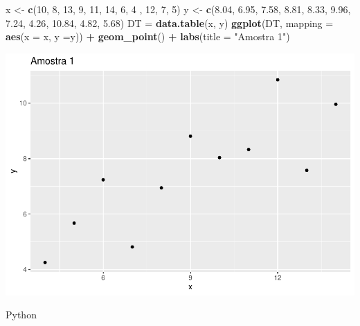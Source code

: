 \documentclass[
]{book}
\newenvironment{Shaded}{\begin{snugshade}}{\end{snugshade}}
\newcommand{\AttributeTok}[1]{\textcolor[rgb]{0.13,0.29,0.53}{#1}}
\newcommand{\DecValTok}[1]{\textcolor[rgb]{0.00,0.00,0.81}{#1}}
\newcommand{\FloatTok}[1]{\textcolor[rgb]{0.00,0.00,0.81}{#1}}
\newcommand{\FunctionTok}[1]{\textcolor[rgb]{0.13,0.29,0.53}{\textbf{#1}}}
\newcommand{\NormalTok}[1]{#1}
\newcommand{\OtherTok}[1]{\textcolor[rgb]{0.56,0.35,0.01}{#1}}
\newcommand{\SpecialCharTok}[1]{\textcolor[rgb]{0.81,0.36,0.00}{\textbf{#1}}}
\newcommand{\StringTok}[1]{\textcolor[rgb]{0.31,0.60,0.02}{#1}}
\begin{document}
\begin{Shaded}
\begin{Highlighting}[]
\NormalTok{x }\OtherTok{\textless{}{-}} \FunctionTok{c}\NormalTok{(}\DecValTok{10}\NormalTok{, }\DecValTok{8}\NormalTok{, }\DecValTok{13}\NormalTok{, }\DecValTok{9}\NormalTok{, }\DecValTok{11}\NormalTok{, }\DecValTok{14}\NormalTok{, }\DecValTok{6}\NormalTok{, }\DecValTok{4}\NormalTok{ , }\DecValTok{12}\NormalTok{, }\DecValTok{7}\NormalTok{, }\DecValTok{5}\NormalTok{)}
\NormalTok{y }\OtherTok{\textless{}{-}} \FunctionTok{c}\NormalTok{(}\FloatTok{8.04}\NormalTok{, }\FloatTok{6.95}\NormalTok{, }\FloatTok{7.58}\NormalTok{, }\FloatTok{8.81}\NormalTok{, }\FloatTok{8.33}\NormalTok{, }\FloatTok{9.96}\NormalTok{, }\FloatTok{7.24}\NormalTok{, }\FloatTok{4.26}\NormalTok{, }\FloatTok{10.84}\NormalTok{, }\FloatTok{4.82}\NormalTok{, }\FloatTok{5.68}\NormalTok{)}
\NormalTok{DT }\OtherTok{=} \FunctionTok{data.table}\NormalTok{(x, y)}
\FunctionTok{ggplot}\NormalTok{(DT, }\AttributeTok{mapping =} \FunctionTok{aes}\NormalTok{(}\AttributeTok{x =}\NormalTok{ x, }\AttributeTok{y =}\NormalTok{y)) }\SpecialCharTok{+}
  \FunctionTok{geom\_point}\NormalTok{() }\SpecialCharTok{+}
  \FunctionTok{labs}\NormalTok{(}\AttributeTok{title =} \StringTok{"Amostra 1"}\NormalTok{)}
\end{Highlighting}
\end{Shaded}

\includegraphics{_main_files/figure-latex/unnamed-chunk-11-1.pdf}

Python
\end{document}
